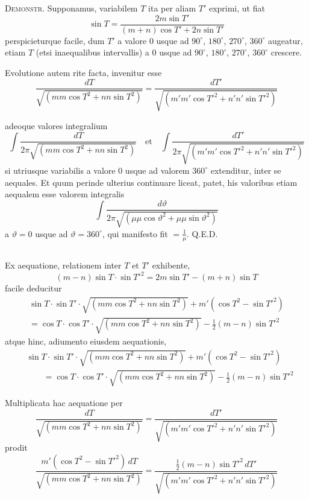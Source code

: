 \documentclass[12pt,a4paper]{article}
\begin{document}
\textsc{Demonstr.} Supponamus, variabilem $T$ ita per aliam $T'$ exprimi, ut fiat
\[
\sin T = \frac{2m\sin T'}{(m+n)\cos T' + 2n\sin T'}
\]
perspicieturque facile, dum $T'$ a valore $0$ usque ad $90^{\circ}$, $180^{\circ}$, $270^{\circ}$, $360^{\circ}$ augeatur, etiam $T$ (etsi inaequalibus intervallis) a $0$ usque ad $90^{\circ}$, $180^{\circ}$, $270^{\circ}$, $360^{\circ}$ crescere.

Evolutione autem rite facta, invenitur esse
\[
\frac{dT}{\sqrt{(mm\cos T^2 + nn\sin T^2)}} =
\frac{dT'}{\sqrt{(m'm'\cos T'^2 + n'n'\sin T'^2)}}
\]

adeoque valores integralium
\[
\int\frac{dT}{2\pi\sqrt{(mm\cos T^2 + nn\sin T^2)}} \quad\text{et}\quad
\int\frac{dT'}{2\pi\sqrt{(m'm'\cos T'^2 + n'n'\sin T'^2)}}
\]
si utriusque variabilis a valore $0$ usque ad valorem $360^{\circ}$ extenditur, inter se aequales. Et quum perinde ulterius continuare liceat, patet, his valoribus etiam aequalem esse valorem integralis
\[
\int\frac{d\vartheta}{2\pi\sqrt{(\mu\mu\cos\vartheta^2 + \mu\mu\sin\vartheta^2)}}
\]
a $\vartheta = 0$ usque ad $\vartheta = 360^{\circ}$, qui manifesto fit $= \frac{1}{\mu}$. \hfill Q.E.D.

\setcounter{subsection}{16}
\subsection{}

Ex aequatione, relationem inter $T$ et $T'$ exhibente,
\[
(m-n)\sin T \cdot \sin T'^2 = 2m\sin T' - (m+n)\sin T
\]
facile deducitur
\[
\begin{aligned}
\sin T \cdot \sin T' \cdot \sqrt{(mm\cos T^2 + nn\sin T^2)} + m'(\cos T^2 - \sin T'^2) \\
= \cos T \cdot \cos T' \cdot \sqrt{(mm\cos T^2 + nn\sin T^2)} - \tfrac{1}{2}(m-n)\sin T'^2
\end{aligned}
\]
atque hinc, adiumento eiusdem aequationis,
\[
\begin{aligned}
&\sin T \cdot \sin T' \cdot \sqrt{(mm\cos T^2 + nn\sin T^2)} + m'(\cos T^2 - \sin T'^2) \\
&\qquad = \cos T \cdot \cos T' \cdot \sqrt{(mm\cos T^2 + nn\sin T^2)} - \tfrac{1}{2}(m-n)\sin T'^2
\end{aligned}
\]

Multiplicata hac aequatione per
\[
\frac{dT}{\sqrt{(mm\cos T^2 + nn\sin T^2)}} =
\frac{dT'}{\sqrt{(m'm'\cos T'^2 + n'n'\sin T'^2)}}
\]
prodit
\[
\frac{m'(\cos T^2 - \sin T'^2)\,dT}{\sqrt{(mm\cos T^2 + nn\sin T^2)}} =
\frac{\tfrac{1}{2}(m-n)\sin T'^2\,dT'}{\sqrt{(m'm'\cos T'^2 + n'n'\sin T'^2)}}
\]
\end{document}
